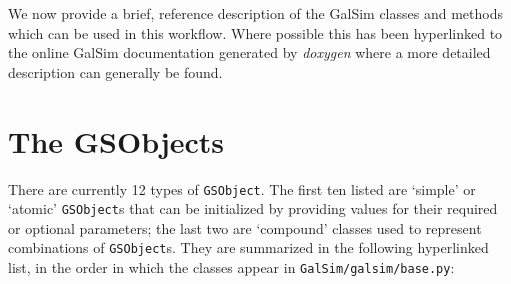 \documentclass[preprint,11pt]{aastex}
\newcommand{\gsobject}{{\tt GSObject}}
\begin{document}
We now provide a brief, reference description of the GalSim classes and methods which
can be used in this workflow.  Where possible this has been
hyperlinked to the online GalSim documentation generated by
\emph{doxygen} where a more detailed description can generally be found.

\newpage

\section{The GSObjects}\label{sect:gsobjects}

There are currently 12 types of \gsobject. The first ten listed are
`simple' or `atomic' \gsobject s that can be initialized by providing
values for their required or optional parameters; the last two are
`compound' classes used to represent combinations of \gsobject s.  
They are summarized in the following hyperlinked list, 
in the order in which the classes appear in {\tt GalSim/galsim/base.py}:
\end{document}
